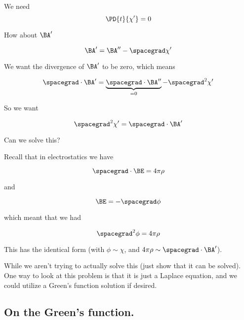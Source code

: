 We need 
\begin{equation}\label{eqn:relativisticElectrodynamicsL14:170}
\PD{t}{\chi'} = 0
\end{equation}

How about $\BA'$

\begin{equation}\label{eqn:relativisticElectrodynamicsL14:190}
\BA' = \BA'' - \spacegrad \chi'
\end{equation}

We want the divergence of $\BA'$ to be zero, which means

\begin{equation}\label{eqn:relativisticElectrodynamicsL14:210}
\spacegrad \cdot \BA' = \underbrace{\spacegrad \cdot \BA''}_{=0} - \spacegrad^2 \chi'
\end{equation}

So we want

\begin{equation}\label{eqn:relativisticElectrodynamicsL14:230}
\spacegrad^2 \chi' = \spacegrad \cdot \BA'
\end{equation}

Can we solve this?

Recall that in electrostatics we have

\begin{equation}\label{eqn:relativisticElectrodynamicsL14:250}
\spacegrad \cdot \BE = 4 \pi \rho
\end{equation}

and 

\begin{equation}\label{eqn:relativisticElectrodynamicsL14:270}
\BE = -\spacegrad \phi
\end{equation}

which meant that we had 

\begin{equation}\label{eqn:relativisticElectrodynamicsL14:290}
\spacegrad^2 \phi = 4 \pi \rho
\end{equation}

This has the identical form (with $\phi \sim \chi$, and $4 \pi \rho \sim \spacegrad \cdot \BA'$).

While we aren't trying to actually solve this (just show that it can be solved).  One way to look at this problem is that it is just a Laplace equation, and we could utilize a Green's function solution if desired.

\subsection{On the Green's function.}

